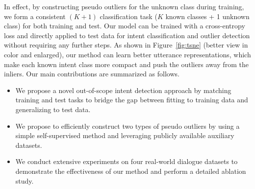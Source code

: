 In effect, by constructing pseudo outliers for the unknown class during training, we form a consistent $(K+1)$ classification task ($K$ known classes + 1 unknown class) for both training and test. Our model can be trained with a cross-entropy loss and directly applied to test data for intent classification and outlier detection without requiring any further steps.
As shown in Figure~\ref{fig:tsne} (better view in color and enlarged), our method can learn better utterance representations, which make each known intent class more compact and push the outliers away from the inliers. Our main contributions are summarized as follows.
\begin{itemize}

\item We propose a novel out-of-scope intent detection approach by matching training and test tasks to bridge the gap between fitting to training data and generalizing to test data.

\item We propose to efficiently construct two types of pseudo outliers by using a simple self-supervised method and leveraging publicly available auxiliary datasets.

\item We conduct extensive experiments on four real-world dialogue datasets to demonstrate the effectiveness of our method and perform a detailed ablation study.
\end{itemize}